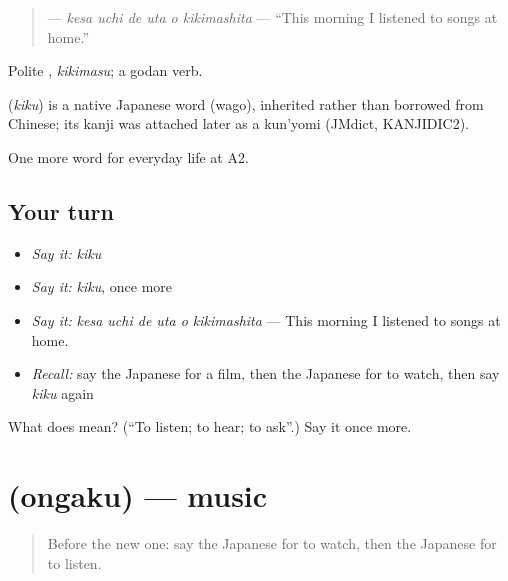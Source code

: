 \begin{quote}
\textbf{   } — \emph{kesa uchi de uta o kikimashita} — \textquotedblleft{}This morning I listened to songs at home.\textquotedblright{}
\end{quote}

Polite \textbf{}, \emph{kikimasu}; a godan verb.

\begin{cousinweb}
\textbf{} (\emph{kiku}) is a native Japanese word (wago), inherited rather than borrowed from Chinese; its kanji was attached later as a kun'yomi (JMdict, KANJIDIC2).
\end{cousinweb}

\begin{grammarlens}[title={What you've built}]
One more word for everyday life at A2.
\end{grammarlens}

\subsection*{Your turn}
\begin{itemize}
\raggedright
  \item \emph{Say it:} \emph{kiku}
  \item \emph{Say it:} \emph{kiku}, once more
  \item \emph{Say it:} \emph{kesa uchi de uta o kikimashita} — This morning I listened to songs at home.
  \item \emph{Recall:} say the Japanese for a film, then the Japanese for to watch, then say \emph{kiku} again
\end{itemize}

\begin{tcolorbox}[breakable,colback=teal!4,colframe=teal!35!black,title={Before you move on}]
What does  mean? (\textquotedblleft{}To listen; to hear; to ask\textquotedblright{}.) Say it once more.
\end{tcolorbox}
\section[\texorpdfstring{\ja{おんがく} (ongaku)}{おんがく (ongaku)}]{ (ongaku) — music}

\label{lesson:JA-C236-ongaku}



\begin{quote}
Before the new one: say the Japanese for to watch, then the Japanese for to listen.
\end{quote}


